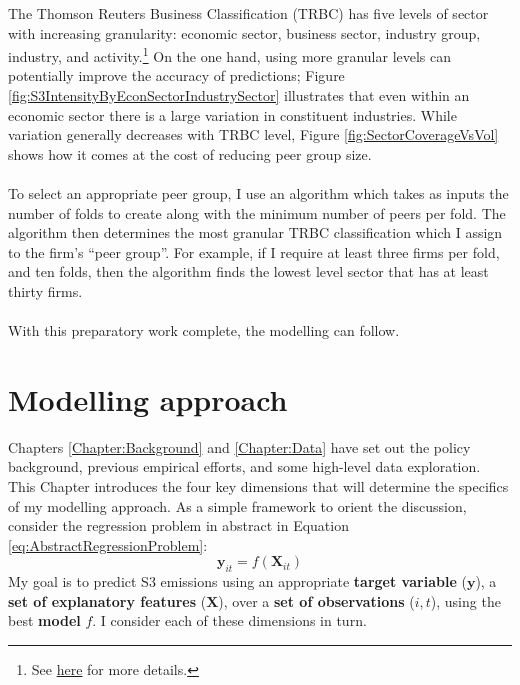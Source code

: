 \documentclass[12pt,twoside]{report}
\begin{document}
The Thomson Reuters Business Classification (TRBC) has five levels of sector with increasing granularity: economic sector, business sector, industry group, industry, and activity.\footnote{See \href{https://www.lseg.com/en/data-analytics/financial-data/indices/trbc-business-classification\#features-and-benefits}{here} for more details.} On the one hand, using more granular levels can potentially improve the accuracy of predictions; Figure \ref{fig:S3IntensityByEconSectorIndustrySector} illustrates that even within an economic sector there is a large variation in constituent industries. While variation generally decreases with TRBC level, Figure \ref{fig:SectorCoverageVsVol} shows how it comes at the cost of reducing peer group size. 
\\\\
To select an appropriate peer group, I use an algorithm which takes as inputs the number of folds to create along with the minimum number of peers per fold. The algorithm then determines the most granular TRBC classification which I assign to the firm's ``peer group''. For example, if I require at least three firms per fold, and ten folds, then the algorithm finds the lowest level sector that has at least thirty firms. 
\\\\
With this preparatory work complete, the modelling can follow. 

\chapter{Modelling approach}\label{Chapter:ModellingApproach}

Chapters \ref{Chapter:Background} and \ref{Chapter:Data} have set out the policy background, previous empirical efforts, and some high-level data exploration. This Chapter introduces the four key dimensions that will determine the specifics of my modelling approach. As a simple framework to orient the discussion, consider the regression problem in abstract in Equation \ref{eq:AbstractRegressionProblem}:
\begin{equation}
    \mathbf{y}_{it} = f\left(\mathbf{X}_{it}\right)
    \label{eq:AbstractRegressionProblem}
\end{equation}
My goal is to predict S3 emissions  using an appropriate \textbf{target variable} ($\mathbf{y}$), a \textbf{set of explanatory features} ($\mathbf{X}$), over a \textbf{set of observations} ($i, t$), using the best \textbf{model} $f$. I consider each of these dimensions in turn.
\end{document}
